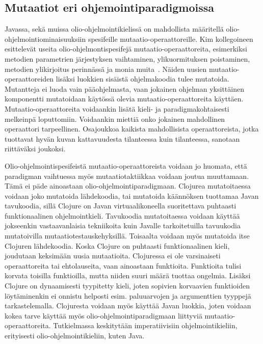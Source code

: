 \documentclass[finnish]{tktltiki2}
\begin{document}
\subsection{Mutaatiot eri ohjemointiparadigmoissa}
Javassa, sekä muissa olio-ohjelmointikielissä on mahdollista määritellä olio-ohjelmointi\-ominaisuuksiin spesifeille mutaatio-operaattoreille. Kim kollegoineen esittelevät useita olio-ohjelmonti\-spesifejä mu\-taa\-tio\--ope\-raatto\-rei\-ta, esimerkiksi metodien parametrien järjestyksen vaihtaminen, ylikuormituksen poistaminen, metodien ylikirjoitus perinnässä ja monia muita~\cite{KimCM00}. Näiden uusien mutaatio-operaattoreiden lisäksi luokkien sisäistä ohjelmakoodia tulee mutatoida. Mutantteja ei luoda vain pääohjelmasta, vaan jokainen ohjelman yksittäinen komponentti mutatoidaan käytössä olevia mu\-taa\-tio\--ope\-raatto\-reita käyttäen. Mutaatio-operaattoreita voidaankin lisätä kieli- ja paradigmakohtaisesti melkeinpä loputtomiin. Voidaankin miettiä onko jokainen mahdollinen operaattori tarpeellinen. Osajoukkoa kaikista mahdollisista operaattoreista, jotka tuottavat hyvän kuvan kattavuudesta tilanteessa kuin tilanteessa, sanotaan riittäväksi joukoksi.

Olio-ohjelmointispesifeistä mutaa\-tio\--ope\-raatto\-reista voidaan jo huomata, että paradigman vaihtuessa myös mutaatiotaktiikkaa voidaan joutua muuttamaan. Tämä ei päde ainoastaan olio-ohjelmointiparadigmaan. Clojurea mutatoitaessa voidaan joko mutatoida lähdekoodia, tai mutatoida käännöksen tuottamaa Javan tavukoodia, sillä Clojure on Javan virtuaalikoneella suoritettava puhtaasti funktionaalinen ohjelmointkieli. Tavukoodia mutatoitaessa voidaan käyttää jokseenkin vastaavanlaisia tekniikoita kuin Javalle tarkoitetuilla tavuukodia mutatoivilla mutaatiotestauskehyksillä. Toisaalta voidaan myös mutatoida itse Clojuren lähdekoodia. Koska Clojure on puhtaasti funktionaalinen kieli, joudutaan keksimään uusia mutaatioita. Clojuressa ei ole varsinaiseti operaattoreita tai ehtolauseita, vaan ainoastaan funktioita. Funktioita tulisi korvata toisilla funktioilla, mutta niiden suuri määrä tuottaa ongelmia. Lisäksi Clojure on dynaamisesti tyypitetty kieli, joten sopivien korvaavien funktioiden löytäminenkin ei onnistu helposti esim. paluuarvojen ja argumenttien tyyppejä tarkastelemalla. Clojuresta voidaan myös käyttää Javan luokkia, joten voidaan kokea tarve käyttää myös olio-ohjelmointiparadigmaan liittyviä mutaatio-operaattoreita. Tutkielmassa keskitytään imperatiivisiin ohjelmointikieliin, erityisesti olio-ohjelmointikieliin, kuten Java.
\end{document}
